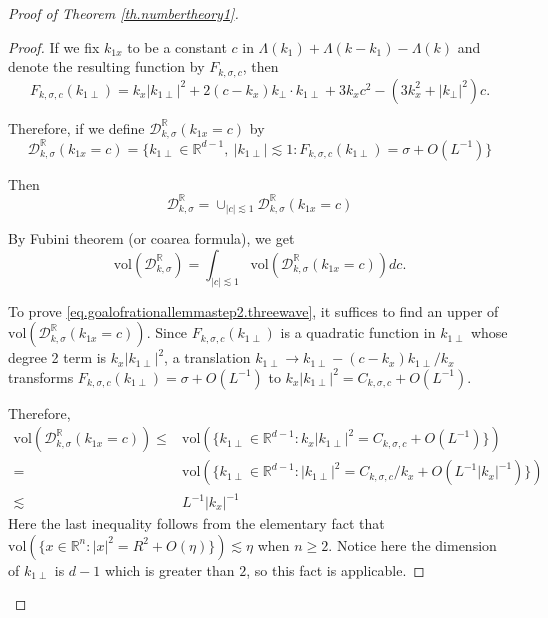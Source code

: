\begin{proof}[Proof of Theorem \ref{th.numbertheory1}]
\begin{proof}
If we fix $k_{1x}$ to be a constant $c$ in $\Lambda(k_1)+\Lambda(k-k_1)-\Lambda(k)$ and denote the resulting function by $F_{k,\sigma, c}$, then 
\begin{equation}
    F_{k,\sigma, c}(k_{1\perp})=k_x|k_{1\perp}|^2+2(c-k_x)k_{\perp}\cdot k_{1\perp}+3k_x c^2-(3k_x^2+|k_{\perp}|^2)c.
\end{equation}

Therefore, if we define $\mathcal{D}^{\mathbb{R}}_{k,\sigma}(k_{1x}=c)$ by
\begin{equation}
\mathcal{D}^{\mathbb{R}}_{k,\sigma}(k_{1x}=c)=\{k_{1\perp}\in \mathbb{R}^{d-1},\ |k_{1\perp}|\lesssim 1:F_{k,\sigma, c}(k_{1\perp})=\sigma+O(L^{-1})\}
\end{equation}

Then 
\begin{equation}
    \mathcal{D}^{\mathbb{R}}_{k,\sigma}=\cup_{|c|\lesssim 1} \mathcal{D}^{\mathbb{R}}_{k,\sigma}(k_{1x}=c)
\end{equation}

By Fubini theorem (or coarea formula), we get
\begin{equation}\label{eq.rationallemmastep2'.threewave}
    \text{vol}(\mathcal{D}^{\mathbb{R}}_{k,\sigma})=\int_{|c|\lesssim 1} \text{vol}(\mathcal{D}^{\mathbb{R}}_{k,\sigma}(k_{1x}=c)) dc.
\end{equation}

To prove \eqref{eq.goalofrationallemmastep2.threewave}, it suffices to find an upper of $\text{vol}(\mathcal{D}^{\mathbb{R}}_{k,\sigma}(k_{1x}=c))$. Since $F_{k,\sigma, c}(k_{1\perp})$ is a quadratic function in $k_{1\perp}$ whose degree 2 term is $k_x|k_{1\perp}|^2$, a translation $k_{1\perp}\rightarrow k_{1\perp}-(c-k_x)k_{1\perp}/k_x$ transforms $F_{k,\sigma, c}(k_{1\perp})=\sigma+O(L^{-1})$ to $k_x|k_{1\perp}|^2=C_{k,\sigma,c}+O(L^{-1})$.

Therefore, 
\begin{equation}\label{eq.rationallemmastep2''.threewave}
\begin{split}
    \text{vol}(\mathcal{D}^{\mathbb{R}}_{k,\sigma}(k_{1x}=c))\le &\text{vol}(\{k_{1\perp}\in \mathbb{R}^{d-1}:k_x|k_{1\perp}|^2=C_{k,\sigma,c}+O(L^{-1})\})
    \\
    =& \text{vol}(\{k_{1\perp}\in \mathbb{R}^{d-1}:|k_{1\perp}|^2=C_{k,\sigma,c}/k_x+O(L^{-1}|k_x|^{-1})\})
    \\
    \lesssim& L^{-1}|k_x|^{-1}
\end{split}
\end{equation}
Here the last inequality follows from the elementary fact that $\text{vol}(\{x\in \mathbb{R}^n:|x|^2=R^2+O(\eta)\})\lesssim \eta$ when $n\ge 2$. Notice here the dimension of $k_{1\perp}$ is $d-1$ which is greater than $2$, so this fact is applicable.


\end{proof}
\end{proof}
